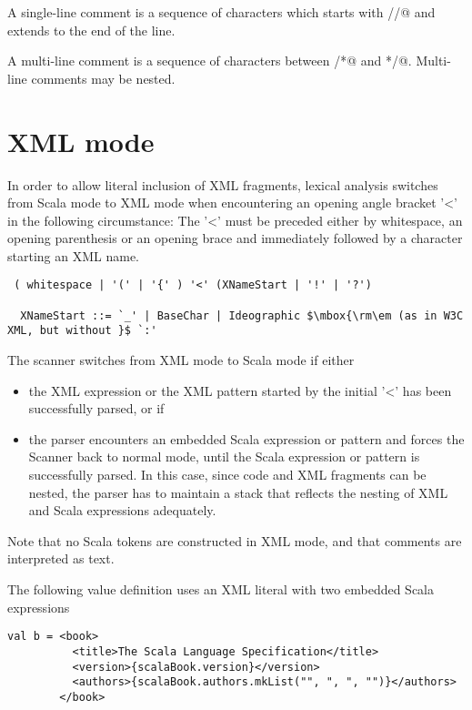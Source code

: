 A single-line comment is a sequence of characters which starts with
\lstinline@//@ and extends to the end of the line.

A multi-line comment is a sequence of characters between \lstinline@/*@ and
\lstinline@*/@. Multi-line comments may be nested.

\section{XML mode\label{sec::xmlMode}}

In order to allow literal inclusion of XML fragments, lexical analysis
switches from Scala mode to XML mode when encountering an opening
angle bracket '<' in the following circumstance: The '<' must be
preceded either by whitespace, an opening parenthesis or an opening
brace and immediately followed by a character starting an XML name.

\syntax\begin{lstlisting}
 ( whitespace | '(' | '{' ) '<' (XNameStart | '!' | '?')

  XNameStart ::= `_' | BaseChar | Ideographic $\mbox{\rm\em (as in W3C XML, but without }$ `:'
\end{lstlisting}

The scanner switches from XML mode to Scala mode if either
\begin{itemize}
\item the XML expression or the XML pattern started by the initial '<' has been 
successfully parsed, or if

\item the parser encounters an embedded Scala expression or pattern and 
forces the Scanner 
back to normal mode, until the Scala expression or pattern is
successfully parsed. In this case, since code and XML fragments can be
nested, the parser has to maintain a stack that reflects the nesting
of XML and Scala expressions adequately.
\end{itemize}

Note that no Scala tokens are constructed in XML mode, and that comments are interpreted
as text.

\example 
The following value definition uses an XML literal with two embedded
Scala expressions
\begin{lstlisting}
val b = <book>
          <title>The Scala Language Specification</title>
          <version>{scalaBook.version}</version>
          <authors>{scalaBook.authors.mkList("", ", ", "")}</authors>
        </book>
\end{lstlisting}

